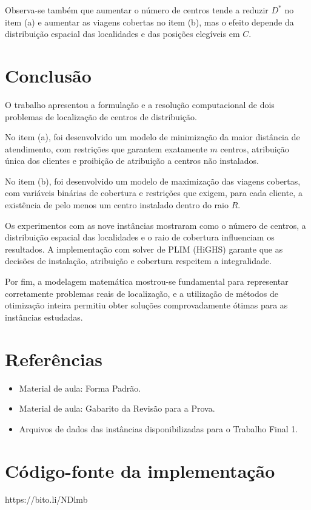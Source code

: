 \documentclass[12pt,a4paper]{article}
\begin{document}
Observa-se também que aumentar o número de centros tende a
reduzir $D^*$ no item (a) e aumentar as viagens cobertas no
item (b), mas o efeito depende da distribuição espacial das
localidades e das posições elegíveis em $C$.

\section{Conclusão}

O trabalho apresentou a formulação e a resolução
computacional de dois problemas de localização de centros
de distribuição.

No item (a), foi desenvolvido um modelo de minimização da
maior distância de atendimento, com restrições que garantem
exatamente $m$ centros, atribuição única dos clientes e
proibição de atribuição a centros não instalados.

No item (b), foi desenvolvido um modelo de maximização das
viagens cobertas, com variáveis binárias de cobertura e
restrições que exigem, para cada cliente, a existência de
pelo menos um centro instalado dentro do raio $R$.

Os experimentos com as nove instâncias mostraram como o
número de centros, a distribuição espacial das localidades
e o raio de cobertura influenciam os resultados. A
implementação com solver de PLIM (HiGHS) garante que as
decisões de instalação, atribuição e cobertura respeitem
a integralidade.

Por fim, a modelagem matemática mostrou-se fundamental para
representar corretamente problemas reais de localização, e
a utilização de métodos de otimização inteira permitiu obter
soluções comprovadamente ótimas para as instâncias
estudadas.

\section{Referências}

\begin{itemize}
    \item Material de aula: Forma Padrão.
    \item Material de aula: Gabarito da Revisão para a Prova.
    \item Arquivos de dados das instâncias disponibilizadas
    para o Trabalho Final 1.
\end{itemize}

\appendix

\section{Código-fonte da implementação}
\label{ap:codigo}

https://bito.li/NDlmb
\end{document}
